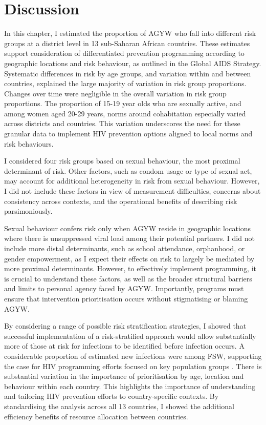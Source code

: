 \documentclass[a4paper, nobind]{templates/ociamthesis}
\begin{document}
\hypertarget{discussion-1}{%
\section{Discussion}\label{discussion-1}}

In this chapter, I estimated the proportion of AGYW who fall into different risk groups at a district level in 13 sub-Saharan African countries.
These estimates support consideration of differentiated prevention programming according to geographic locations and risk behaviour, as outlined in the Global AIDS Strategy.
Systematic differences in risk by age groups, and variation within and between countries, explained the large majority of variation in risk group proportions.
Changes over time were negligible in the overall variation in risk group proportions.
The proportion of 15-19 year olds who are sexually active, and among women aged 20-29 years, norms around cohabitation especially varied across districts and countries.
This variation underscores the need for these granular data to implement HIV prevention options aligned to local norms and risk behaviours.

I considered four risk groups based on sexual behaviour, the most proximal determinant of risk.
Other factors, such as condom usage or type of sexual act, may account for additional heterogeneity in risk from sexual behaviour.
However, I did not include these factors in view of measurement difficulties, concerns about consistency across contexts, and the operational benefits of describing risk parsimoniously.

Sexual behaviour confers risk only when AGYW reside in geographic locations where there is unsuppressed viral load among their potential partners.
I did not include more distal determinants, such as school attendance, orphanhood, or gender empowerment, as I expect their effects on risk to largely be mediated by more proximal determinants.
However, to effectively implement programming, it is crucial to understand these factors, as well as the broader structural barriers and limits to personal agency faced by AGYW.
Importantly, programs must ensure that intervention prioritisation occurs without stigmatising or blaming AGYW.

By considering a range of possible risk stratification strategies, I showed that successful implementation of a risk-stratified approach would allow substantially more of those at risk for infections to be identified before infection occurs.
A considerable proportion of estimated new infections were among FSW, supporting the case for HIV programming efforts focused on key population groups \autocite{baral2012burden}.
There is substantial variation in the importance of prioritisation by age, location and behaviour within each country.
This highlights the importance of understanding and tailoring HIV prevention efforts to country-specific contexts.
By standardising the analysis across all 13 countries, I showed the additional efficiency benefits of resource allocation between countries.
\end{document}

